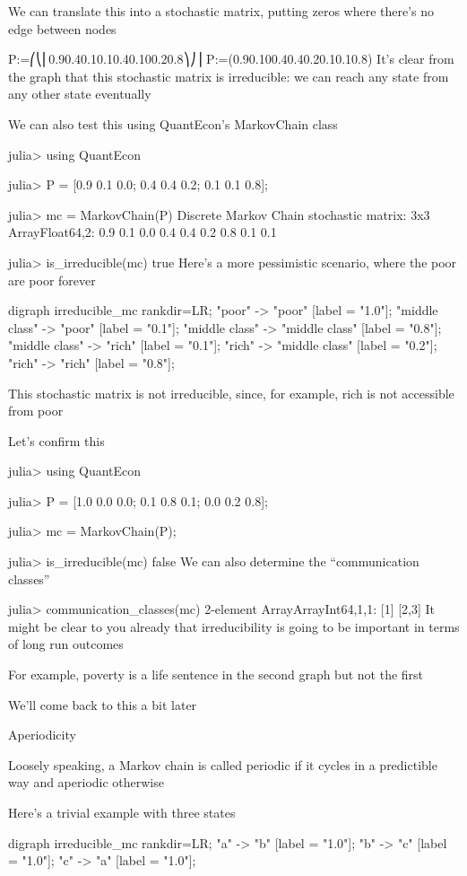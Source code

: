 We can translate this into a stochastic matrix, putting zeros where there’s no edge between nodes

P:=⎛⎝⎜0.90.40.10.10.40.100.20.8⎞⎠⎟
P:=(0.90.100.40.40.20.10.10.8)
It’s clear from the graph that this stochastic matrix is irreducible: we can reach any state from any other state eventually

We can also test this using QuantEcon’s MarkovChain class

julia> using QuantEcon

julia> P = [0.9 0.1 0.0; 0.4 0.4 0.2; 0.1 0.1 0.8];

julia> mc = MarkovChain(P)
Discrete Markov Chain
stochastic matrix:
3x3 Array{Float64,2}:
 0.9  0.1  0.0
 0.4  0.4  0.2
 0.8  0.1  0.1

julia> is_irreducible(mc)
true
Here’s a more pessimistic scenario, where the poor are poor forever

digraph irreducible_mc { rankdir=LR; "poor" -> "poor" [label = "1.0"]; "middle class" -> "poor" [label = "0.1"]; "middle class" -> "middle class" [label = "0.8"]; "middle class" -> "rich" [label = "0.1"]; "rich" -> "middle class" [label = "0.2"]; "rich" -> "rich" [label = "0.8"]; }

This stochastic matrix is not irreducible, since, for example, rich is not accessible from poor

Let’s confirm this

julia> using QuantEcon

julia> P = [1.0 0.0 0.0; 0.1 0.8 0.1; 0.0 0.2 0.8];

julia> mc = MarkovChain(P);

julia> is_irreducible(mc)
false
We can also determine the “communication classes”

julia> communication_classes(mc)
2-element Array{Array{Int64,1},1}:
 [1]
 [2,3]
It might be clear to you already that irreducibility is going to be important in terms of long run outcomes

For example, poverty is a life sentence in the second graph but not the first

We’ll come back to this a bit later

Aperiodicity

Loosely speaking, a Markov chain is called periodic if it cycles in a predictible way and aperiodic otherwise

Here’s a trivial example with three states

digraph irreducible_mc { rankdir=LR; "a" -> "b" [label = "1.0"]; "b" -> "c" [label = "1.0"]; "c" -> "a" [label = "1.0"]; }

